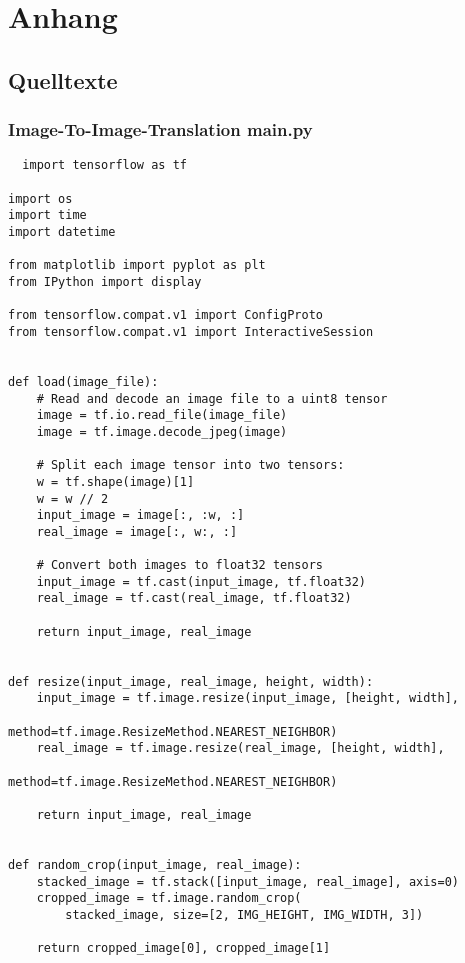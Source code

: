 \part*{Anhang}

\chapter{Quelltexte}
\label{ch:a_sim}

\section{Image-To-Image-Translation main.py}
\label{pix2pixpy}

\begin{lstlisting}
  import tensorflow as tf

import os
import time
import datetime

from matplotlib import pyplot as plt
from IPython import display

from tensorflow.compat.v1 import ConfigProto
from tensorflow.compat.v1 import InteractiveSession


def load(image_file):
    # Read and decode an image file to a uint8 tensor
    image = tf.io.read_file(image_file)
    image = tf.image.decode_jpeg(image)

    # Split each image tensor into two tensors:
    w = tf.shape(image)[1]
    w = w // 2
    input_image = image[:, :w, :]
    real_image = image[:, w:, :]

    # Convert both images to float32 tensors
    input_image = tf.cast(input_image, tf.float32)
    real_image = tf.cast(real_image, tf.float32)

    return input_image, real_image


def resize(input_image, real_image, height, width):
    input_image = tf.image.resize(input_image, [height, width],
                                  method=tf.image.ResizeMethod.NEAREST_NEIGHBOR)
    real_image = tf.image.resize(real_image, [height, width],
                                 method=tf.image.ResizeMethod.NEAREST_NEIGHBOR)

    return input_image, real_image


def random_crop(input_image, real_image):
    stacked_image = tf.stack([input_image, real_image], axis=0)
    cropped_image = tf.image.random_crop(
        stacked_image, size=[2, IMG_HEIGHT, IMG_WIDTH, 3])

    return cropped_image[0], cropped_image[1]



\end{lstlisting}
